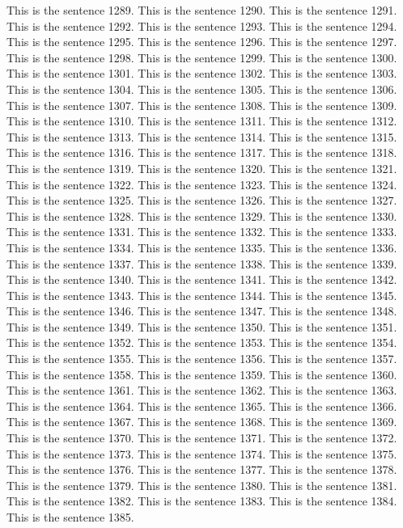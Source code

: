 \documentclass{article}
\begin{document}
This is the sentence 1289.
This is the sentence 1290.
This is the sentence 1291.
This is the sentence 1292.
This is the sentence 1293.
This is the sentence 1294.
This is the sentence 1295.
This is the sentence 1296.
This is the sentence 1297.
This is the sentence 1298.
This is the sentence 1299.
This is the sentence 1300.
This is the sentence 1301.
This is the sentence 1302.
This is the sentence 1303.
This is the sentence 1304.
This is the sentence 1305.
This is the sentence 1306.
This is the sentence 1307.
This is the sentence 1308.
This is the sentence 1309.
This is the sentence 1310.
This is the sentence 1311.
This is the sentence 1312.
This is the sentence 1313.
This is the sentence 1314.
This is the sentence 1315.
This is the sentence 1316.
This is the sentence 1317.
This is the sentence 1318.
This is the sentence 1319.
This is the sentence 1320.
This is the sentence 1321.
This is the sentence 1322.
This is the sentence 1323.
This is the sentence 1324.
This is the sentence 1325.
This is the sentence 1326.
This is the sentence 1327.
This is the sentence 1328.
This is the sentence 1329.
This is the sentence 1330.
This is the sentence 1331.
This is the sentence 1332.
This is the sentence 1333.
This is the sentence 1334.
This is the sentence 1335.
This is the sentence 1336.
This is the sentence 1337.
This is the sentence 1338.
This is the sentence 1339.
This is the sentence 1340.
This is the sentence 1341.
This is the sentence 1342.
This is the sentence 1343.
This is the sentence 1344.
This is the sentence 1345.
This is the sentence 1346.
This is the sentence 1347.
This is the sentence 1348.
This is the sentence 1349.
This is the sentence 1350.
This is the sentence 1351.
This is the sentence 1352.
This is the sentence 1353.
This is the sentence 1354.
This is the sentence 1355.
This is the sentence 1356.
This is the sentence 1357.
This is the sentence 1358.
This is the sentence 1359.
This is the sentence 1360.
This is the sentence 1361.
This is the sentence 1362.
This is the sentence 1363.
This is the sentence 1364.
This is the sentence 1365.
This is the sentence 1366.
This is the sentence 1367.
This is the sentence 1368.
This is the sentence 1369.
This is the sentence 1370.
This is the sentence 1371.
This is the sentence 1372.
This is the sentence 1373.
This is the sentence 1374.
This is the sentence 1375.
This is the sentence 1376.
This is the sentence 1377.
This is the sentence 1378.
This is the sentence 1379.
This is the sentence 1380.
This is the sentence 1381.
This is the sentence 1382.
This is the sentence 1383.
This is the sentence 1384.
This is the sentence 1385.
\end{document}

